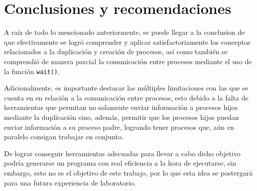 \section{Conclusiones y recomendaciones}
A raíz de todo lo mencionado anteriormente, se puede llegar a la conclusion de que efectivamente se logró comprender y aplicar satisfactoriamente los conceptos relacionados a la duplicación y creación de procesos, así como también se comprendió de manera parcial la comunicación entre procesos mediante el uso de la función \verb|wait()|.

Adicionalmente, es importante destacar las múltiples limitaciones con las que se cuenta en en relación a la comunicación entre procesos, esto debido a la falta de herramientas que permitan no solamente enviar información a procesos hijos mediante la duplicación sino, además, permitir que los procesos hijos puedan enviar información a su proceso padre, logrando tener procesos que, aún en paralelo consigan trabajar en conjunto.

De lograr conseguir herramientas adecuadas para llevar a cabo dicho objetivo podría generarse un programa con real eficiencia a la hora de ejecutarse, sin embargo, esto no es el objetivo de este trabajo, por lo que esta idea se postergará para una futura experiencia de laboratorio.